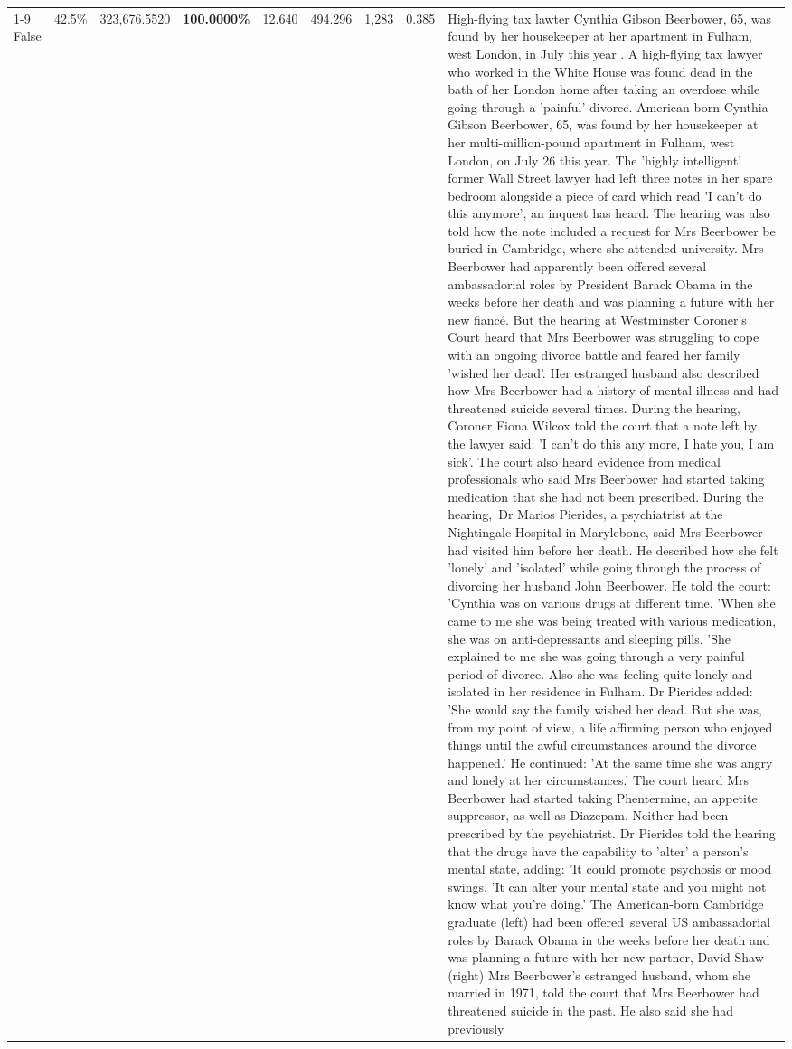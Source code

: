 \begin{table}[H]
\begin{tabular}{lllrlllll}
\cline{1-9}
False & 42.5\% & 323,676.5520 & \bfseries \color{red} 100.0000\% & 12.640 & 494.296 & 1,283 & 0.385 & High-flying tax lawter Cynthia Gibson Beerbower, 65, was found by her housekeeper at her apartment in Fulham, west London, in July this year . A high-flying tax lawyer who worked in the White House was found dead in the bath of her London home after taking an overdose while going through a 'painful' divorce. American-born Cynthia Gibson Beerbower, 65, was found by her housekeeper at her multi-million-pound apartment in Fulham, west London, on July 26 this year. The 'highly intelligent' former Wall Street lawyer had left three notes in her spare bedroom alongside a piece of card which read 'I can't do this anymore', an inquest has heard. The hearing was also told how the note included a request for Mrs Beerbower be buried in Cambridge, where she attended university. Mrs Beerbower had apparently been offered several ambassadorial roles by President Barack Obama in the weeks before her death and was planning a future with her new fiancé. But the hearing at Westminster Coroner's Court heard that Mrs Beerbower was struggling to cope with an ongoing divorce battle and feared her family 'wished her dead'. Her estranged husband also described how Mrs Beerbower had a history of mental illness and had threatened suicide several times. During the hearing, Coroner Fiona Wilcox told the court that a note left by the lawyer said: 'I can't do this any more, I hate you, I am sick'. The court also heard evidence from medical professionals who said Mrs Beerbower had started taking medication that she had not been prescribed. During the hearing, Dr Marios Pierides, a psychiatrist at the Nightingale Hospital in Marylebone, said Mrs Beerbower had visited him before her death. He described how she felt 'lonely' and 'isolated' while going through the process of divorcing her husband John Beerbower. He told the court: 'Cynthia was on various drugs at different time. 'When she came to me she was being treated with various medication, she was on anti-depressants and sleeping pills. 'She explained to me she was going through a very painful period of divorce. Also she was feeling quite lonely and isolated in her residence in Fulham. Dr Pierides added: 'She would say the family wished her dead. But she was, from my point of view, a life affirming person who enjoyed things until the awful circumstances around the divorce happened.' He continued: 'At the same time she was angry and lonely at her circumstances.' The court heard Mrs Beerbower had started taking Phentermine, an appetite suppressor, as well as Diazepam. Neither had been prescribed by the psychiatrist. Dr Pierides told the hearing that the drugs have the capability to 'alter' a person's mental state, adding: 'It could promote psychosis or mood swings. 'It can alter your mental state and you might not know what you're doing.' The American-born Cambridge graduate (left) had been offered several US ambassadorial roles by Barack Obama in the weeks before her death and was planning a future with her new partner, David Shaw (right) Mrs Beerbower's estranged husband, whom she married in 1971, told the court that Mrs Beerbower had threatened suicide in the past. He also said she had previously 
\end{tabular}
\end{table}
